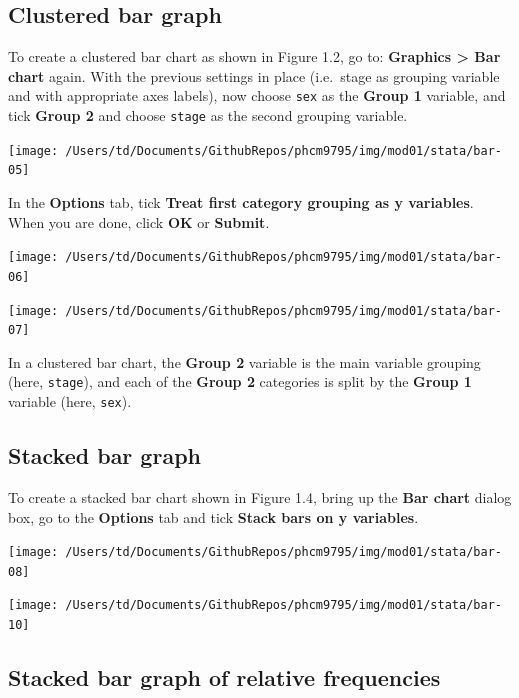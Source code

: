 \documentclass[
]{memoir}
\begin{document}
\hypertarget{clustered-bar-graph}{%
\subsection{Clustered bar graph}\label{clustered-bar-graph}}

To create a clustered bar chart as shown in Figure 1.2, go to: \textbf{Graphics \textgreater{} Bar chart} again. With the previous settings in place (i.e.~stage as grouping variable and with appropriate axes labels), now choose \texttt{sex} as the \textbf{Group 1} variable, and tick \textbf{Group 2} and choose \texttt{stage} as the second grouping variable.

\texttt{[image: /Users/td/Documents/GithubRepos/phcm9795/img/mod01/stata/bar-05]}

In the \textbf{Options} tab, tick \textbf{Treat first category grouping as y variables}. When you are done, click \textbf{OK} or \textbf{Submit}.

\texttt{[image: /Users/td/Documents/GithubRepos/phcm9795/img/mod01/stata/bar-06]}

\texttt{[image: /Users/td/Documents/GithubRepos/phcm9795/img/mod01/stata/bar-07]}

In a clustered bar chart, the \textbf{Group 2} variable is the main variable grouping (here, \texttt{stage}), and each of the \textbf{Group 2} categories is split by the \textbf{Group 1} variable (here, \texttt{sex}).

\hypertarget{stacked-bar-graph}{%
\subsection{Stacked bar graph}\label{stacked-bar-graph}}

To create a stacked bar chart shown in Figure 1.4, bring up the \textbf{Bar chart} dialog box, go to the \textbf{Options} tab and tick \textbf{Stack bars on y variables}.

\texttt{[image: /Users/td/Documents/GithubRepos/phcm9795/img/mod01/stata/bar-08]}

\texttt{[image: /Users/td/Documents/GithubRepos/phcm9795/img/mod01/stata/bar-10]}

\hypertarget{stacked-bar-graph-of-relative-frequencies}{%
\subsection{Stacked bar graph of relative frequencies}\label{stacked-bar-graph-of-relative-frequencies}}
\end{document}
